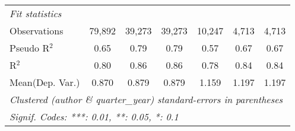 \begin{tabular}{lcccccc}
   \emph{Fit statistics}\\
   Observations            & 79,892  & 39,273  & 39,273  & 10,247  & 4,713   & 4,713\\  
   Pseudo R$^2$            & 0.65    & 0.79    & 0.79    & 0.57    & 0.67    & 0.67\\  
   R$^2$                   & 0.80    & 0.86    & 0.86    & 0.78    & 0.84    & 0.84\\  
Mean(Dep. Var.) & 0.870 & 0.879 & 0.879 & 1.159 & 1.197 & 1.197 \\
   \midrule \midrule
   \multicolumn{7}{l}{\emph{Clustered (author \& quarter\_year) standard-errors in parentheses}}\\
   \multicolumn{7}{l}{\emph{Signif. Codes: ***: 0.01, **: 0.05, *: 0.1}}\\
\end{tabular}
\par\endgroup

